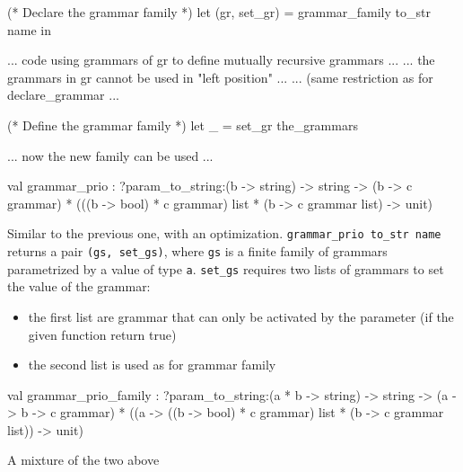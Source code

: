 \documentclass[11pt]{article}
\begin{document}
\begin{ocamldoccode}

   (* Declare the grammar family *)
   let (gr, set_gr) = grammar_family to_str name in

   ... code using grammars of gr to define mutually recursive grammars ...
   ... the grammars in gr cannot be used in "left position" ...
   ... (same restriction as for declare_grammar ...

   (* Define the grammar family *)
   let _ = set_gr the_grammars

   ... now the new family can be used ...
   
\end{ocamldoccode}




\label{val:Earley.grammar-underscoreprio}\begin{ocamldoccode}
val grammar_prio :
  ?param_to_string:({\textquotesingle}b -> string) ->
  string ->
  ({\textquotesingle}b -> {\textquotesingle}c grammar) *
  ((({\textquotesingle}b -> bool) * {\textquotesingle}c grammar) list * ({\textquotesingle}b -> {\textquotesingle}c grammar list) ->
   unit)
\end{ocamldoccode}
\begin{ocamldocdescription}
Similar to the previous one, with an optimization.
    {\tt{grammar\_prio to\_str name}} returns a pair {\tt{(gs, set\_gs)}}, where
    {\tt{gs}} is a finite family of grammars parametrized by a value of type {\tt{{\textquotesingle}a}}.
    {\tt{set\_gs}} requires two lists of grammars to set the value of the grammar:\begin{itemize}
\item the first list are grammar that can only be activated by the parameter
      (if the given function return true)
\item the second list is used as for grammar family
\end{itemize}



\end{ocamldocdescription}




\label{val:Earley.grammar-underscoreprio-underscorefamily}\begin{ocamldoccode}
val grammar_prio_family :
  ?param_to_string:({\textquotesingle}a * {\textquotesingle}b -> string) ->
  string ->
  ({\textquotesingle}a -> {\textquotesingle}b -> {\textquotesingle}c grammar) *
  (({\textquotesingle}a ->
    (({\textquotesingle}b -> bool) * {\textquotesingle}c grammar) list * ({\textquotesingle}b -> {\textquotesingle}c grammar list)) ->
   unit)
\end{ocamldoccode}
\begin{ocamldocdescription}
A mixture of the two above


\end{ocamldocdescription}
\end{document}
